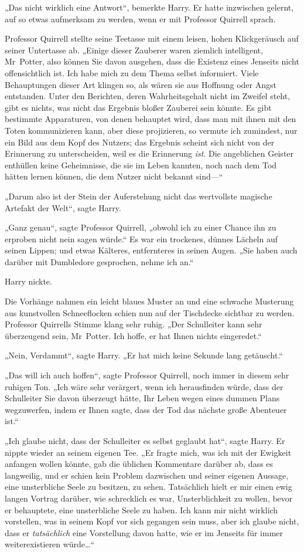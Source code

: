 {„Das nicht wirklich eine Antwort“, bemerkte Harry. Er hatte inzwischen gelernt, auf so etwas aufmerksam zu werden, wenn er mit Professor Quirrell sprach.

Professor Quirrell stellte seine Teetasse mit einem leisen, hohen Klickgeräusch auf seiner Untertasse ab. „Einige dieser Zauberer waren ziemlich intelligent, Mr~Potter, also können Sie davon ausgehen, dass die Existenz eines Jenseits nicht offensichtlich ist. Ich habe mich zu dem Thema selbst informiert. Viele Behauptungen dieser Art klingen so, als wären sie aus Hoffnung oder Angst entstanden. Unter den Berichten, deren Wahrheitsgehalt nicht im Zweifel steht, gibt es nichts, was nicht das Ergebnis bloßer Zauberei sein könnte. Es gibt bestimmte Apparaturen, von denen behauptet wird, dass man mit ihnen mit den Toten kommunizieren kann, aber diese projizieren, so vermute ich zumindest, nur ein Bild aus dem Kopf des Nutzers; das Ergebnis scheint sich nicht von der Erinnerung zu unterscheiden, weil es die Erinnerung \emph{ist}. Die angeblichen Geister enthüllen keine Geheimnisse, die sie im Leben kannten, noch nach dem Tod hätten lernen können, die dem Nutzer nicht bekannt sind—“

„Darum also ist der Stein der Auferstehung nicht das wertvollste magische Artefakt der Welt“, sagte Harry.

„Ganz genau“, sagte Professor Quirrell, „obwohl ich zu einer Chance ihn zu erproben nicht nein sagen würde.“ Es war ein trockenes, dünnes Lächeln auf seinen Lippen; und etwas Kälteres, entfernteres in seinen Augen. „Sie haben auch darüber mit Dumbledore gesprochen, nehme ich an.“

Harry nickte.

Die Vorhänge nahmen ein leicht blaues Muster an und eine schwache Musterung aus kunstvollen Schneeflocken schien nun auf der Tischdecke sichtbar zu werden. Professor Quirrells Stimme klang sehr ruhig. „Der Schulleiter kann sehr überzeugend sein, Mr~Potter. Ich hoffe, er hat Ihnen nichts eingeredet.“

„Nein, Verdammt“, sagte Harry. „Er hat mich keine Sekunde lang getäuscht.“

„Das will ich auch hoffen“, sagte Professor Quirrell, noch immer in diesem sehr ruhigen Ton. „Ich wäre sehr verärgert, wenn ich herausfinden würde, dass der Schulleiter Sie davon überzeugt hätte, Ihr Leben wegen eines dummen Plans wegzuwerfen, indem er Ihnen sagte, dass der Tod das nächste große Abenteuer ist.“

„Ich glaube nicht, dass der Schulleiter es selbst geglaubt hat“, sagte Harry. Er nippte wieder an seinem eigenen Tee. „Er fragte mich, was ich mit der Ewigkeit anfangen wollen könnte, gab die üblichen Kommentare darüber ab, dass es langweilig, und er schien kein Problem dazwischen und seiner eigenen Aussage, eine unsterbliche Seele zu besitzen, zu sehen. Tatsächlich hielt er mir einen ewig langen Vortrag darüber, wie schrecklich es war, Unsterblichkeit zu wollen, bevor er behauptete, eine unsterbliche Seele zu haben. Ich kann mir nicht wirklich vorstellen, was in seinem Kopf vor sich gegangen sein muss, aber ich glaube nicht, dass er \emph{tatsächlich} eine Vorstellung davon hatte, wie er im Jenseits für immer weiterexistieren würde…“

}
